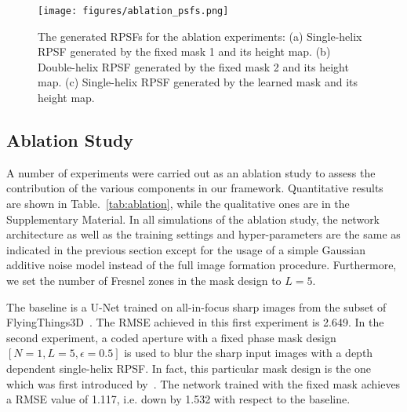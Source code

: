 \documentclass[preprint,5p,twocolumn]{elsarticle}
\begin{document}
\begin{figure}[h!]
\centering
\texttt{[image: figures/ablation\_psfs.png]}

\caption{The generated RPSFs for the ablation experiments: (a) Single-helix RPSF generated by the fixed mask 1 and its height map. (b) Double-helix RPSF generated by the fixed mask 2 and its height map. (c) Single-helix RPSF generated by the learned mask and its height map.}
\label{fig:ablation_psfs}
\end{figure}

\subsection{Ablation Study}
\label{sub_sec:ablation}


A number of experiments were carried out as an ablation study to assess the contribution of the various components in our framework.  Quantitative results are shown in Table.~\ref{tab:ablation}, while  the qualitative ones are in the Supplementary Material. In all simulations of the ablation study, the network architecture as well as the training settings and hyper-parameters are the same as indicated in the previous section except for the usage of
a simple Gaussian additive noise model  instead of the full  image formation procedure. Furthermore, we set the number of Fresnel zones in the mask design  to $L=5$.


\begin{table}[h!]
\begin{center}
\end{center}
\caption{Quantitative results of the ablation experiments on the test set of FlyingThings3D~\cite{MIFDB16}.}
\label{tab:ablation}
\end{table}

The baseline is a U-Net trained on all-in-focus sharp images from the subset of FlyingThings3D~\cite{MIFDB16}. The RMSE achieved in this first experiment is 2.649. In the second experiment, a coded aperture with a fixed phase mask design $[N=1,L=5,\epsilon=0.5]$ is used to blur the sharp input images with a depth dependent single-helix RPSF. In fact, this particular mask design is the one which was first introduced by~\cite{prasad2013rotating}. The network trained with the fixed mask achieves a RMSE value of 1.117, i.e. down by 1.532 with respect to the baseline.
\end{document}
